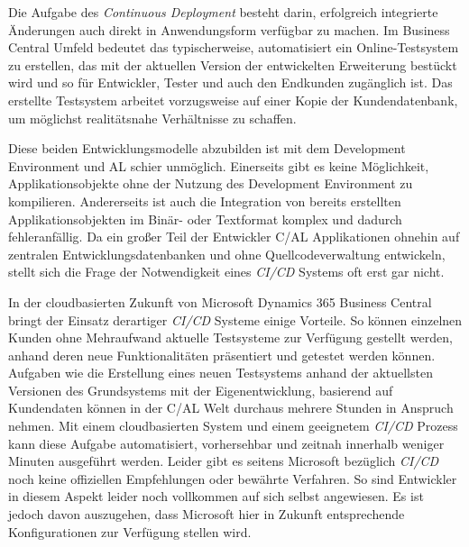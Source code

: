 Die Aufgabe des \textit{Continuous Deployment} besteht darin, erfolgreich integrierte Änderungen auch direkt in Anwendungsform verfügbar zu machen. Im Business Central Umfeld bedeutet das typischerweise, automatisiert ein Online-Testsystem zu erstellen, das mit der aktuellen Version der entwickelten Erweiterung bestückt wird und so für Entwickler, Tester und auch den Endkunden zugänglich ist. Das erstellte Testsystem arbeitet vorzugsweise auf einer Kopie der Kundendatenbank, um möglichst realitätsnahe Verhältnisse zu schaffen.

Diese beiden Entwicklungsmodelle abzubilden ist mit dem Development Environment und AL schier unmöglich. Einerseits gibt es keine Möglichkeit, Applikationsobjekte ohne der Nutzung des Development Environment zu kompilieren. Andererseits ist auch die Integration von bereits erstellten Applikationsobjekten im Binär- oder Textformat komplex und dadurch fehleranfällig. Da ein großer Teil der Entwickler C/AL Applikationen ohnehin auf zentralen Entwicklungsdatenbanken und ohne Quellcodeverwaltung entwickeln, stellt sich die Frage der Notwendigkeit eines \textit{CI/CD} Systems oft erst gar nicht. 

In der cloudbasierten Zukunft von Microsoft Dynamics 365 Business Central bringt der Einsatz derartiger \textit{CI/CD} Systeme einige Vorteile. So können einzelnen Kunden ohne Mehraufwand aktuelle Testsysteme zur Verfügung gestellt werden, anhand deren neue Funktionalitäten präsentiert und getestet werden können. Aufgaben wie die Erstellung eines neuen Testsystems anhand der aktuellsten Versionen des Grundsystems mit der Eigenentwicklung, basierend auf Kundendaten können in der C/AL Welt durchaus mehrere Stunden in Anspruch nehmen. Mit einem cloudbasierten System und einem geeignetem \textit{CI/CD} Prozess kann diese Aufgabe automatisiert, vorhersehbar und zeitnah innerhalb weniger Minuten ausgeführt werden. Leider gibt es seitens Microsoft bezüglich \textit{CI/CD} noch keine offiziellen Empfehlungen oder bewährte Verfahren. So sind Entwickler in diesem Aspekt leider noch vollkommen auf sich selbst angewiesen. Es ist jedoch davon auszugehen, dass Microsoft hier in Zukunft entsprechende Konfigurationen zur Verfügung stellen wird. 




